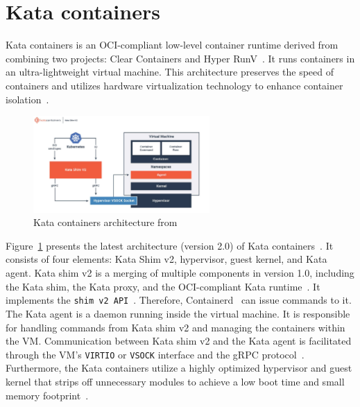 \section{Kata containers}
\label{sec:Kata}

Kata containers is an OCI-compliant low-level container runtime derived from combining two projects: Clear Containers and Hyper RunV~\cite*{Kata-Containers}. It runs containers in an ultra-lightweight virtual machine. This architecture preserves the speed of containers and utilizes 
hardware virtualization technology to enhance container isolation~\cite*{Kata-Containers}.
\begin{figure}[htp]
  \centering
  \includegraphics[width=0.6\textwidth]{images/kata.PNG}
  \caption[Kata containers architecture]{Kata containers architecture from~\cite*{Kata-Containers} }
  \label{fig:kata}
\end{figure}
Figure~\ref{fig:kata} presents the latest architecture (version 2.0) of Kata containers~\cite*{Kata_arch}. It consists of four elements: Kata Shim v2, hypervisor, guest kernel, and Kata agent. Kata shim v2 is a merging of multiple components in version 1.0, including the Kata shim, 
the Kata proxy, and the OCI-compliant Kata runtime~\cite*{Kata_arch}. It implements the \texttt{shim v2 API}~\cite*{shim_v2}. Therefore, Containerd~\cite*{containerd} can issue commands to it.  The Kata agent is a daemon running inside the virtual machine. It is responsible for handling commands 
from Kata shim v2 and managing the containers within the VM. Communication between Kata shim v2 and the Kata agent is facilitated through the VM's \texttt{VIRTIO} or \texttt{VSOCK} interface and the gRPC protocol~\cite*{Kata_arch}. Furthermore, the 
Kata containers utilize a highly optimized hypervisor and guest kernel that strips off unnecessary modules to achieve a low boot time and small memory footprint~\cite*{8939164}.


